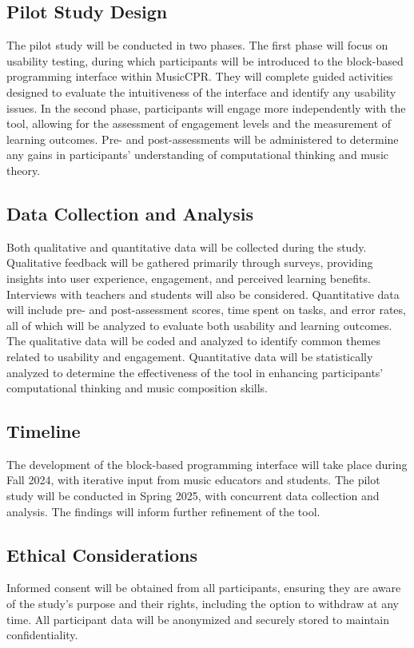 \documentclass[manuscript,screen,review]{acmart}
\begin{document}
\subsection{Pilot Study Design}
The pilot study will be conducted in two phases. The first phase will focus on usability testing, during which participants will be introduced to the block-based programming interface within MusicCPR. They will complete guided activities designed to evaluate the intuitiveness of the interface and identify any usability issues. In the second phase, participants will engage more independently with the tool, allowing for the assessment of engagement levels and the measurement of learning outcomes. Pre- and post-assessments will be administered to determine any gains in participants’ understanding of computational thinking and music theory.

\subsection{Data Collection and Analysis}
Both qualitative and quantitative data will be collected during the study. Qualitative feedback will be gathered primarily through surveys, providing insights into user experience, engagement, and perceived learning benefits. Interviews with teachers and students will also be considered. Quantitative data will include pre- and post-assessment scores, time spent on tasks, and error rates, all of which will be analyzed to evaluate both usability and learning outcomes. The qualitative data will be coded and analyzed to identify common themes related to usability and engagement. Quantitative data will be statistically analyzed to determine the effectiveness of the tool in enhancing participants’ computational thinking and music composition skills.

\subsection{Timeline}
The development of the block-based programming interface will take place during Fall 2024, with iterative input from music educators and students. The pilot study will be conducted in Spring 2025, with concurrent data collection and analysis. The findings will inform further refinement of the tool.

\subsection{Ethical Considerations}
Informed consent will be obtained from all participants, ensuring they are aware of the study’s purpose and their rights, including the option to withdraw at any time. All participant data will be anonymized and securely stored to maintain confidentiality.
\end{document}
